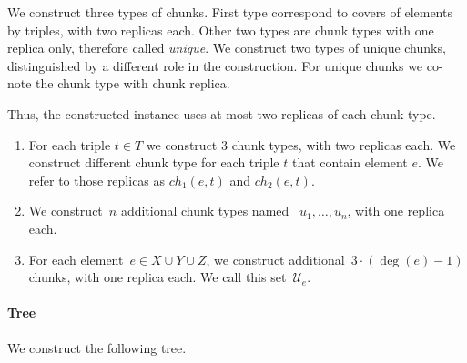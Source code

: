 \documentclass[preprint,12pt]{elsarticle}
\newcommand{\UniqueE}{{\ensuremath{\mathcal{U}_e}}}
\begin{document}
We construct three types of chunks. First type correspond to covers of elements by triples, with two replicas each. Other two types are chunk types with one replica only, therefore called \emph{unique}. We construct two types of unique chunks, distinguished by a different role in the construction. For unique chunks we co-note the chunk type with chunk replica.

Thus, the constructed instance uses at most two replicas of each chunk type.

\begin{enumerate}
  \item For each triple $t\in T$ we construct $3$ chunk types, with two replicas each. We construct different chunk type for each triple $t$ that contain element $e$. We refer to those replicas as $ch_1(e, t)$ and $ch_2(e, t)$.
  \item We construct~$n$ additional chunk types named
  ~$u_1, \ldots, u_n$, with one replica each.
  \item For each element~$e\in X\cup Y\cup Z$,
  we construct additional~$3\cdot(\deg(e) - 1)$ chunks, with one replica each.
  We call this set~$\UniqueE$.
\end{enumerate}

\paragraph{Tree}

We construct the following tree.
\end{document}
